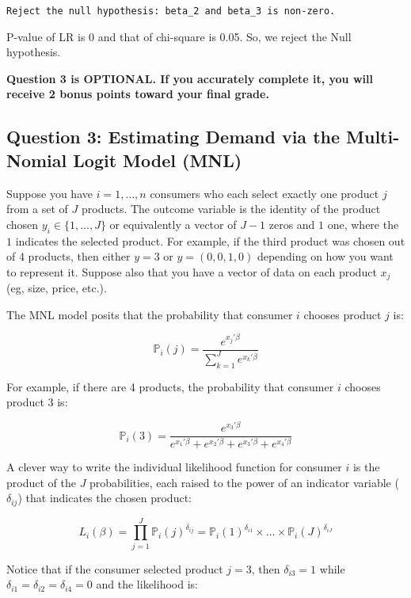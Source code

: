 \documentclass[
  letterpaper,
  DIV=11,
  numbers=noendperiod]{scrartcl}
\begin{document}
\begin{verbatim}
Reject the null hypothesis: beta_2 and beta_3 is non-zero.
\end{verbatim}

P-value of LR is 0 and that of chi-square is 0.05. So, we reject the
Null hypothesis.

\newpage

\textbf{Question 3 is OPTIONAL. If you accurately complete it, you will
receive 2 bonus points toward your final grade.}

\hypertarget{question-3-estimating-demand-via-the-multi-nomial-logit-model-mnl}{%
\subsection{Question 3: Estimating Demand via the Multi-Nomial Logit
Model
(MNL)}\label{question-3-estimating-demand-via-the-multi-nomial-logit-model-mnl}}

Suppose you have \(i=1,\ldots,n\) consumers who each select exactly one
product \(j\) from a set of \(J\) products. The outcome variable is the
identity of the product chosen \(y_i \in \{1, \ldots, J\}\) or
equivalently a vector of \(J-1\) zeros and \(1\) one, where the \(1\)
indicates the selected product. For example, if the third product was
chosen out of 4 products, then either \(y=3\) or \(y=(0,0,1,0)\)
depending on how you want to represent it. Suppose also that you have a
vector of data on each product \(x_j\) (eg, size, price, etc.).

The MNL model posits that the probability that consumer \(i\) chooses
product \(j\) is:

\[ \mathbb{P}_i(j) = \frac{e^{x_j'\beta}}{\sum_{k=1}^Je^{x_k'\beta}} \]

For example, if there are 4 products, the probability that consumer
\(i\) chooses product 3 is:

\[ \mathbb{P}_i(3) = \frac{e^{x_3'\beta}}{e^{x_1'\beta} + e^{x_2'\beta} + e^{x_3'\beta} + e^{x_4'\beta}} \]

A clever way to write the individual likelihood function for consumer
\(i\) is the product of the \(J\) probabilities, each raised to the
power of an indicator variable (\(\delta_{ij}\)) that indicates the
chosen product:

\[ L_i(\beta) = \prod_{j=1}^J \mathbb{P}_i(j)^{\delta_{ij}} = \mathbb{P}_i(1)^{\delta_{i1}} \times \ldots \times \mathbb{P}_i(J)^{\delta_{iJ}}\]

Notice that if the consumer selected product \(j=3\), then
\(\delta_{i3}=1\) while \(\delta_{i1}=\delta_{i2}=\delta_{i4}=0\) and
the likelihood is:
\end{document}
